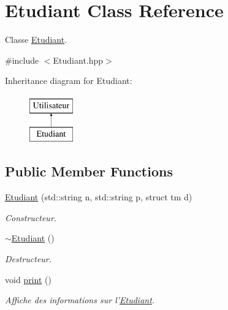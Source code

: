 \hypertarget{classEtudiant}{\section{Etudiant Class Reference}
\label{classEtudiant}
}


Classe \hyperlink{classEtudiant}{Etudiant}.  




{\ttfamily \#include $<$Etudiant.\-hpp$>$}

Inheritance diagram for Etudiant\-:\begin{figure}[H]
\begin{center}
\leavevmode
\includegraphics[height=2.000000cm]{classEtudiant}
\end{center}
\end{figure}
\subsection*{Public Member Functions}
\begin{DoxyCompactItemize}
\item 
\hyperlink{classEtudiant_a3074a4459cca24f8862faa7118242e2b}{Etudiant} (std\-::string n, std\-::string p, struct tm d)
\begin{DoxyCompactList}\small\item\em Constructeur. \end{DoxyCompactList}\item 
\hyperlink{classEtudiant_a47bb756690e1389b6fbd1d2f65cd4eac}{$\sim$\-Etudiant} ()
\begin{DoxyCompactList}\small\item\em Destructeur. \end{DoxyCompactList}\item 
\hypertarget{classEtudiant_a4e9a71af9aba98f15b6fbe5bbe41d2d7}{void \hyperlink{classEtudiant_a4e9a71af9aba98f15b6fbe5bbe41d2d7}{print} ()}\label{classEtudiant_a4e9a71af9aba98f15b6fbe5bbe41d2d7}

\begin{DoxyCompactList}\small\item\em Affiche des informations sur l'\hyperlink{classEtudiant}{Etudiant}. \end{DoxyCompactList}\end{DoxyCompactItemize}
